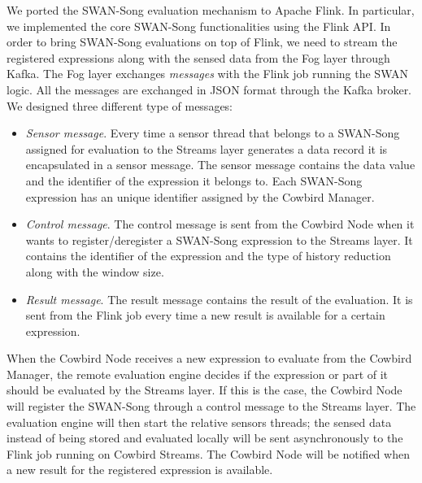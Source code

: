 We ported the SWAN-Song evaluation mechanism to Apache Flink. In particular, we implemented the core SWAN-Song functionalities using the Flink API. In order to bring SWAN-Song evaluations on top of Flink, we need to stream the registered expressions along with the sensed data from the Fog layer through Kafka. The Fog layer exchanges \emph{messages} with the Flink job running the SWAN logic. All the messages are exchanged in JSON format through the Kafka broker. We designed three different type of messages:
\begin{itemize}
\item \emph{Sensor message}. Every time a sensor thread that belongs to a SWAN-Song assigned for evaluation to the Streams layer generates a data record it is encapsulated in a sensor message. The sensor message contains the data value and the identifier of the expression it belongs to. Each SWAN-Song expression has an unique identifier assigned by the Cowbird Manager.
\item \emph{Control message}. The control message is sent from the Cowbird Node when it wants to register/deregister a SWAN-Song expression to the Streams layer. It contains the identifier of the expression and the type of history reduction along with the window size.
\item	 \emph{Result message}. The result message contains the result of the evaluation. It is sent from the Flink job every time a new result is available for a certain expression.  
\end{itemize}

When the Cowbird Node receives a new expression to evaluate from the Cowbird Manager, the remote evaluation engine decides if the expression or part of it should be evaluated by the Streams layer. If this is the case, the Cowbird Node will register the SWAN-Song through a control message to the Streams layer. The evaluation engine will then start the relative sensors threads; the sensed data instead of being stored and evaluated locally will be sent asynchronously to the Flink job running on Cowbird Streams. The Cowbird Node will be notified when a new result for the registered expression is available.
